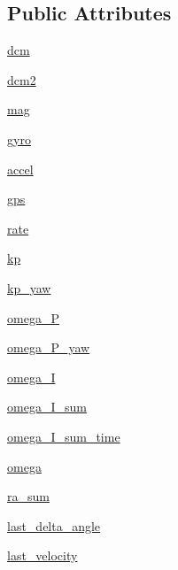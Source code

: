 \subsection*{Public Attributes}
\begin{DoxyCompactItemize}
\item 
\mbox{\hyperlink{classpymavlink_1_1mavextra_1_1DCM__State_a3367bfa8416e59425024c30355084064}{dcm}}
\item 
\mbox{\hyperlink{classpymavlink_1_1mavextra_1_1DCM__State_a2f8b4848ff0164814d62b9e7350ad19b}{dcm2}}
\item 
\mbox{\hyperlink{classpymavlink_1_1mavextra_1_1DCM__State_a4d04b8ef6413c3ddfe3256b94fd4af40}{mag}}
\item 
\mbox{\hyperlink{classpymavlink_1_1mavextra_1_1DCM__State_a811e975d99347cd0574347ca8fb82527}{gyro}}
\item 
\mbox{\hyperlink{classpymavlink_1_1mavextra_1_1DCM__State_af2a01ad15a9bbae4e42d7dfd4d34725f}{accel}}
\item 
\mbox{\hyperlink{classpymavlink_1_1mavextra_1_1DCM__State_a87bd8281f7ff13ac0766e867207cdf99}{gps}}
\item 
\mbox{\hyperlink{classpymavlink_1_1mavextra_1_1DCM__State_a5ccb643559e6aa178a43bb8bd070458d}{rate}}
\item 
\mbox{\hyperlink{classpymavlink_1_1mavextra_1_1DCM__State_a669196ce32d7d222e86e227648d999a4}{kp}}
\item 
\mbox{\hyperlink{classpymavlink_1_1mavextra_1_1DCM__State_acb1b3117b999fffa35a73bf4fa3ce1cf}{kp\+\_\+yaw}}
\item 
\mbox{\hyperlink{classpymavlink_1_1mavextra_1_1DCM__State_af4f366a0fe2808fa0a3618ab898984c9}{omega\+\_\+P}}
\item 
\mbox{\hyperlink{classpymavlink_1_1mavextra_1_1DCM__State_a1dd12e84153fffce4852b2f695c99faf}{omega\+\_\+\+P\+\_\+yaw}}
\item 
\mbox{\hyperlink{classpymavlink_1_1mavextra_1_1DCM__State_a8f84e96ad236ec88b7021c217e0793a1}{omega\+\_\+I}}
\item 
\mbox{\hyperlink{classpymavlink_1_1mavextra_1_1DCM__State_a58b21b469aa1f0e4abc2d8043f5b7b09}{omega\+\_\+\+I\+\_\+sum}}
\item 
\mbox{\hyperlink{classpymavlink_1_1mavextra_1_1DCM__State_ad2908f8fe18ebea6209ab2be9f9e4be4}{omega\+\_\+\+I\+\_\+sum\+\_\+time}}
\item 
\mbox{\hyperlink{classpymavlink_1_1mavextra_1_1DCM__State_a95544c6b3aafe46c2faf9e650bfe15a3}{omega}}
\item 
\mbox{\hyperlink{classpymavlink_1_1mavextra_1_1DCM__State_a6a4dfa55567c0993a4bfaac87540fcd9}{ra\+\_\+sum}}
\item 
\mbox{\hyperlink{classpymavlink_1_1mavextra_1_1DCM__State_ae6071d18abe3032886035efefb049eef}{last\+\_\+delta\+\_\+angle}}
\item 
\mbox{\hyperlink{classpymavlink_1_1mavextra_1_1DCM__State_ad4c4248dd987046009832718babf1646}{last\+\_\+velocity}}
\end{DoxyCompactItemize}


